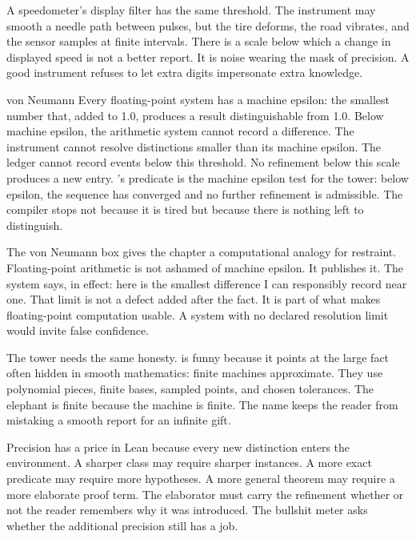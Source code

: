A speedometer's display filter has the same threshold. The instrument may
smooth a needle path between pulses, but the tire deforms, the road vibrates,
and the sensor samples at finite intervals. There is a scale below which a
change in displayed speed is not a better report. It is noise wearing the mask
of precision. A good instrument refuses to let extra digits impersonate extra
knowledge.

\begin{gphenom}{von Neumann}
\label{ph:von-neumann}
\GPhObs Every floating-point system has a machine epsilon: the smallest number
that, added to 1.0, produces a result distinguishable from 1.0. Below machine
epsilon, the arithmetic system cannot record a difference.
\GPhCon The instrument cannot resolve distinctions smaller than its machine
epsilon. The ledger cannot record events below this threshold. No refinement
below this scale produces a new entry.
\GPhSeq {}'s  predicate is the machine epsilon
test for the tower: below epsilon, the sequence has converged and no further
refinement is admissible. The compiler stops not because it is tired but
because there is nothing left to distinguish.
\end{gphenom}

The von Neumann box gives the chapter a computational analogy for restraint.
Floating-point arithmetic is not ashamed of machine epsilon. It publishes it.
The system says, in effect: here is the smallest difference I can responsibly
record near one. That limit is not a defect added after the fact. It is part of
what makes floating-point computation usable. A system with no declared
resolution limit would invite false confidence.

The tower needs the same honesty.  is funny because it
points at the large fact often hidden in smooth mathematics: finite machines
approximate. They use polynomial pieces, finite bases, sampled points, and
chosen tolerances. The elephant is finite because the machine is finite. The
name keeps the reader from mistaking a smooth report for an infinite gift.

Precision has a price in Lean because every new distinction enters the
environment. A sharper class may require sharper instances. A more exact
predicate may require more hypotheses. A more general theorem may require a
more elaborate proof term. The elaborator must carry the refinement whether or
not the reader remembers why it was introduced. The bullshit meter asks whether
the additional precision still has a job.

